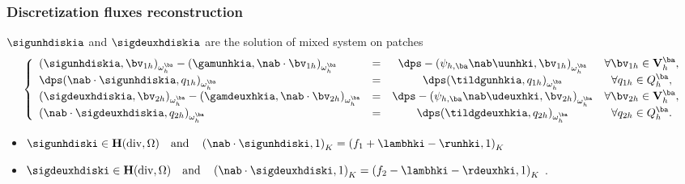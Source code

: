 \documentclass[10 pt]{beamer}
\renewcommand{\div}{\mathrm{div}}
\begin{document}
\begin{frame}
\frametitle{Discretization fluxes reconstruction}
$\sigunhdiskia$ and $\sigdeuxhdiskia$ are the solution of mixed system on patches
\begin{equation*}
\left\lbrace\begin{array}{llccc}
(\sigunhdiskia,{\bv}_{1h})_{\omega_{h}^{\ba}}-(\gamunhkia,\nab \cdot {\bv}_{1h})_{\omega_{h}^{\ba}} &=& \dps -\left(\psi_{h,\ba} \nab \uunhki,{\bv}_{1h}\right)_{\omega_h^{\ba}}  & \forall {\bv}_{1h}\in {\bf V}_{h}^{\ba}, \\
\dps(\nab \cdot \sigunhdiskia,q_{1h})_{\omega_{h}^{\ba}}&=&\dps(\tildgunhkia,q_{1h})_{\omega_{h}^{\ba}} & \forall q_{1h}\in Q_{h}^{\ba},\\
(\sigdeuxhdiskia,{\bv}_{2h})_{\omega_{h}^{\ba}}-(\gamdeuxhkia,\nab \cdot {\bv}_{2h})_{\omega_{h}^{\ba}} &=& \dps-\left(\psi_{h,\ba} \nab \udeuxhki,{\bv}_{2h}\right)_{\omega_h^{\ba}} & \forall {\bv}_{2h}\in {\bf V}_{h}^{\ba},\\
(\nab \cdot \sigdeuxhdiskia,q_{2h})_{\omega_{h}^{\ba}}&=&\dps(\tildgdeuxhkia,q_{2h})_{\omega_{h}^{\ba}} & \forall q_{2h} \in Q_{h}^{\ba}.
\end{array}
\right.
\end{equation*}
\hspace{1.2 cm}
\begin{itemize}
\item
$\sigunhdiski  \in \textbf H(\div,\Omega) \quad \mbox{and} \quad \left(\nab \cdot \sigunhdiski, 1\right)_K = \left(f_1 + \lambhki -\runhki ,1\right)_K$
\item
$\sigdeuxhdiski \in \textbf H(\div,\Omega) \quad \mbox{and} \quad \left(\nab \cdot \sigdeuxhdiski, 1\right)_K = \left(f_2 - \lambhki -\rdeuxhki ,1\right)_K$ .
\end{itemize}
\end{frame}
\end{document}
